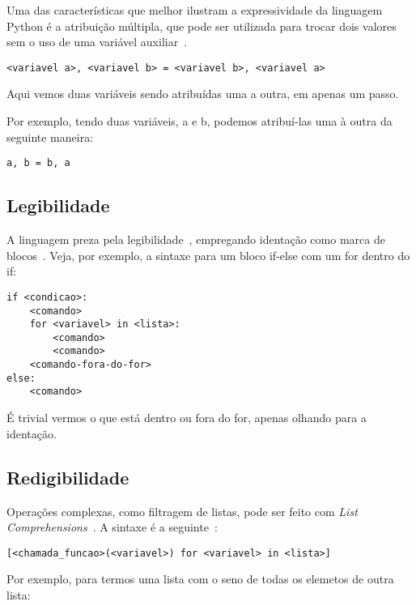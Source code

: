 \documentclass[12pt]{article}
\begin{document}
Uma das características que melhor ilustram a expressividade da linguagem Python
é a atribuição múltipla, que pode ser utilizada para trocar dois valores sem o
uso de uma variável auxiliar~\cite{Rossum:1995:PRM:869369}.

\begin{lstlisting}
<variavel a>, <variavel b> = <variavel b>, <variavel a>
\end{lstlisting}

Aqui vemos duas variáveis sendo atribuídas uma a outra, em apenas um passo.

Por exemplo, tendo duas variáveis, \textsf{a} e \textsf{b}, podemos atribuí-las
uma à outra da seguinte maneira:

\begin{lstlisting}
a, b = b, a
\end{lstlisting}

\subsection{Legibilidade}\label{sec:legibilidade}

A linguagem preza pela legibilidade~\cite{Rossum:1995:PRM:869369}, empregando identação como marca de blocos~\cite{Rossum:1995:PRM:869369}.
Veja, por exemplo, a sintaxe para um bloco \textsf{if-else} com um \textsf{for}
dentro do \textsf{if}:

\begin{lstlisting}
if <condicao>:
    <comando>
    for <variavel> in <lista>:
        <comando>
        <comando>
    <comando-fora-do-for>
else:
    <comando>
\end{lstlisting}

É trivial vermos o que está dentro ou fora do \textsf{for}, apenas olhando para
a identação.

\subsection{Redigibilidade}\label{sec:redigibilidade}

Operações complexas, como filtragem de listas, pode ser feito com \textit{List
  Comprehensions}~\cite{Rossum:1995:PRM:869369}. A sintaxe é a seguinte~\cite{Rossum:1995:PRM:869369}:

\begin{lstlisting}
[<chamada_funcao>(<variavel>) for <variavel> in <lista>]
\end{lstlisting}

Por exemplo, para termos uma lista com o seno de todas os elemetos de outra
lista:
\end{document}

